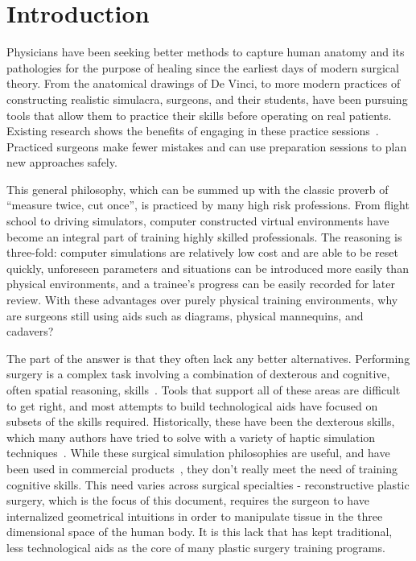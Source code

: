 \chapter{Introduction}

Physicians have been seeking better methods to capture human anatomy and
its pathologies for the purpose of healing since the earliest days of
modern surgical theory. From the anatomical drawings of De Vinci, to more
modern practices of constructing realistic simulacra, surgeons, and
their students, have been pursuing tools that allow them to practice
their skills before operating on real patients. Existing research
shows the benefits of engaging in these practice
sessions~\citep{GallaRCHFMSS:2005}. Practiced surgeons make fewer
mistakes and can use preparation sessions to plan new approaches
safely.

This general philosophy, which can be summed up with the classic
proverb of ``measure twice, cut once'', is practiced by many high risk
professions. From flight school to driving simulators, computer
constructed virtual environments have become an integral part of
training highly skilled professionals. The reasoning is three-fold:
computer simulations are relatively low cost and are able to be reset
quickly, unforeseen parameters and situations can be introduced more easily
than physical environments, and a trainee's progress can be easily
recorded for later review. With these advantages over purely physical
training environments, why are surgeons still using aids such as
diagrams, physical mannequins, and cadavers?

The part of the answer is that they often lack any better
alternatives. Performing surgery is a complex task involving a
combination of dexterous and cognitive, often spatial reasoning,
skills~\citep{GallaRCHFMSS:2005}. Tools that support all of these areas
are difficult to get right, and most attempts to build technological
aids have focused on subsets of the skills required. Historically,
these have been the dexterous skills, which many authors have tried to
solve with a variety of haptic simulation
techniques~\citep{MendoL:2003, LindbT:2007}. While these surgical
simulation philosophies are useful, and have been used in commercial
products~\citep{SUSAC:2002--2014}, they don't really meet the need of
training cognitive skills. This need varies across surgical
specialties - reconstructive plastic surgery, which is the focus of this document,
requires the surgeon to have internalized geometrical intuitions in
order to manipulate tissue in the three dimensional space of the human
body. It is this lack that has kept traditional, less technological
aids as the core of many plastic surgery training programs.


